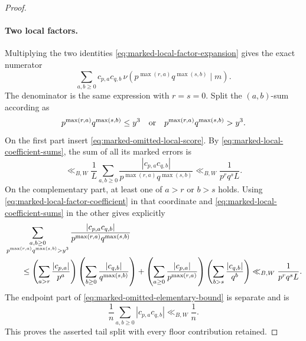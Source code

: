 \documentclass[11pt]{article}
\numberwithin{equation}{section}
\theoremstyle{definition}
\theoremstyle{remark}
\newcommand{\1}{\mathbf 1}
\begin{document}
\begin{proof}
\paragraph{Two local factors.}
Multiplying the two identities
\eqref{eq:marked-local-factor-expansion} gives the exact numerator
\begin{equation}
 \sum_{a,b\ge0}c_{p,a}c_{q,b}\,
 \nu\!\left(p^{\max(r,a)}q^{\max(s,b)}\mid m\right).
 \label{eq:marked-two-local-exact-numerator}
\end{equation}
The denominator is the same expression with \(r=s=0\).  Split the
\((a,b)\)-sum according as
\begin{equation}
       p^{\max(r,a)}q^{\max(s,b)}\le y^3
       \quad\hbox{or}\quad
       p^{\max(r,a)}q^{\max(s,b)}>y^3.
 \label{eq:marked-two-local-tail-split}
\end{equation}
On the first part insert \eqref{eq:marked-omitted-local-score}.  By
\eqref{eq:marked-local-coefficient-sums}, the sum of all its marked
errors is
\begin{equation}
 \ll_{B,W}\frac1L
 \sum_{a,b\ge0}\frac{|c_{p,a}c_{q,b}|}
 {p^{\max(r,a)}q^{\max(s,b)}}
 \ll_{B,W}\frac1{p^rq^sL}.
 \label{eq:marked-two-local-inside-error}
\end{equation}
On the complementary part, at least one of \(a>r\) or \(b>s\) holds.
Using \eqref{eq:marked-local-factor-coefficient} in that coordinate and
\eqref{eq:marked-local-coefficient-sums} in the other gives explicitly
\begin{align}
 &\sum_{\substack{a,b\ge0\\
 p^{\max(r,a)}q^{\max(s,b)}>y^3}}
 \frac{|c_{p,a}c_{q,b}|}
 {p^{\max(r,a)}q^{\max(s,b)}}
 \notag\\
 &\qquad\le
 \left(\sum_{a>r}\frac{|c_{p,a}|}{p^a}\right)
       \left(\sum_{b\ge0}\frac{|c_{q,b}|}{q^{\max(s,b)}}\right)
 +\left(\sum_{a\ge0}\frac{|c_{p,a}|}{p^{\max(r,a)}}\right)
       \left(\sum_{b>s}\frac{|c_{q,b}|}{q^b}\right)
 \ll_{B,W}\frac1{p^rq^sL}.
 \label{eq:marked-two-local-reciprocal-tail}
\end{align}
The endpoint part of \eqref{eq:marked-omitted-elementary-bound} is
separate and is
\begin{equation}
 \frac1n\sum_{a,b\ge0}|c_{p,a}c_{q,b}|\ll_{B,W}\frac1n.
 \label{eq:marked-two-local-endpoint-tail}
\end{equation}
This proves the asserted tail split with every floor contribution
retained.


\end{proof}
\end{document}
